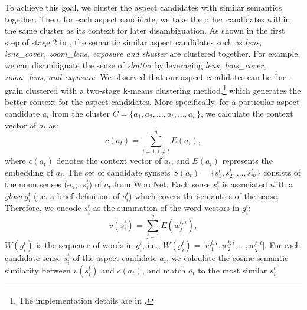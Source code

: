 To achieve this goal, we cluster
the aspect candidates with similar semantics together.
Then, for each aspect candidate, 
we take the other candidates within the same cluster
as its context for later disambiguation.
As shown in the first step of stage 2 in , 
the semantic similar aspect candidates such as 
{\em lens, lens\_cover, zoom\_lens, exposure and shutter}
are clustered together.
For example, we can disambiguate the sense of \emph{shutter} by 
leveraging {\em lens, lens\_cover, zoom\_lens, and exposure}.
We observed that our aspect candidates can be fine-grain 
clustered with a two-stage k-means clustering 
method,\footnote{The implementation details are in .}
which generates the better context for the 
aspect candidates.  More specifically, for a particular aspect candidate $a_t$ 
from the cluster $C = \lbrace a_1, a_2, ..., a_t, ..., a_n \rbrace$, 
we calculate the context vector of $a_t$ as:
\begin{equation}
c(a_t) = \sum_{i=1, i\neq t}^{n} E(a_i),
\end{equation}
where $c(a_t)$ denotes the context vector of $a_t$, 
and $E(a_i)$ represents the embedding of $a_i$.
The set of candidate synsets 
$S(a_t) = \lbrace s^t_1, s^t_2, ..., s^t_m \rbrace$ 
consists of the noun senses (e.g. $s^t_i$) of $a_t$  from WordNet.
Each sense $s^t_i$ is associated with a \emph{gloss} $g^t_i$
(i.e. a brief definition of $s^t_i$) which 
covers the semantics of the sense.
Therefore, we encode $s^t_i$ as the summation
of the word vectors in $g^t_i$:
\begin{equation}
\label{gloss_vec}
v(s^t_i) = \sum_{j=1}^{q} E(w^{t,i}_j),
\end{equation}
$W(g^t_i)$ is the sequence of words in $g^t_i$, i.e., 
$W(g^t_i) = \lbrack w^{t,i}_1, w^{t,i}_2, ..., w^{t,i}_q \rbrack$.
For each candidate sense $s^t_i$ of 
the aspect candidate $a_t$,
we calculate the cosine semantic similarity
between $v(s^t_i)$ and $c(a_t)$, and
match $a_t$ to the most similar $s^t_i$.



